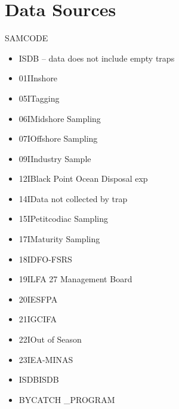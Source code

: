\documentclass[paper=a4, fontsize=11pt]{scrartcl}	%
\numberwithin{equation}{section}		%
\numberwithin{figure}{section}			%
\numberwithin{table}{section}				%
\begin{document}
\section{Data Sources}
	SAMCODE
		\begin{itemize}
			\item{ISDB} – data does not include empty traps 
			\item{01IInshore}
			\item{05ITagging}
			\item{06IMidshore Sampling }
			\item{07IOffshore Sampling }	
			\item{09IIndustry Sample }
			\item{12IBlack Point Ocean Disposal exp }
			\item{14IData not collected by trap }
			\item{15IPetitcodiac Sampling }
			\item{17IMaturity Sampling }
			\item{18IDFO-FSRS }
			\item{19ILFA 27 Management Board }
			\item{20IESFPA }
			\item{21IGCIFA }
			\item{22IOut of Season }
			\item{23IEA-MINAS }
			\item{ISDBISDB }
			\item{BYCATCH _PROGRAM }
		\end{itemize}
\end{document}

